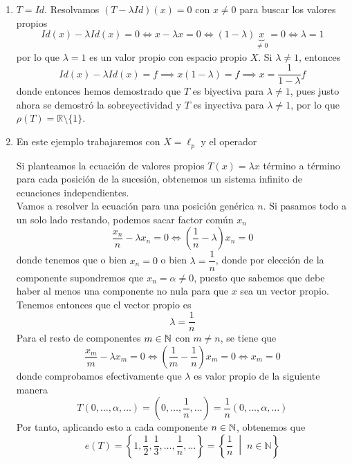 \begin{ejemplo}
    \begin{enumerate}
        \item $T = Id$. Resolvamos $(T - \lambda Id)(x) = 0$ con $x\neq 0$ para buscar los valores propios 
        \begin{equation*}
                Id(x) - \lambda Id(x) = 0\iff x - \lambda x = 0 \iff (1 - \lambda)\underbrace{x}_{\neq 0} = 0 \iff \lambda = 1
        \end{equation*}
        por lo que $\lambda = 1$ es un valor propio con espacio propio $X$. Si $\lambda \neq 1$, entonces 
        $$Id(x) - \lambda Id(x) = f \implies x(1 - \lambda) = f \implies x = \frac{1}{1 - \lambda} f$$ 
        donde entonces hemos demostrado que $T$ es biyectiva para $\lambda \neq 1$, pues justo ahora se demostró la sobreyectividad y $T$ es inyectiva para $\lambda \neq 1$, por lo que $\rho(T) = \mathbb{R} \setminus \{1\}$.
        \item En este ejemplo trabajaremos con $X = \ell_p$ y el operador

        Si planteamos la ecuación de valores propios $T(x) = \lambda x$ término a término para cada posición de la sucesión, obtenemos un sistema infinito de ecuaciones independientes. \\
        \noindent
        Vamos a resolver la ecuación para una posición genérica $n$. Si pasamos todo a un solo lado restando, podemos sacar factor común $x_n$
        $$\frac{x_n}{n} - \lambda x_n = 0 \iff \left(\frac{1}{n} - \lambda\right) x_n = 0$$
        donde tenemos que o bien $x_n = 0$ o bien $\lambda = \dfrac{1}{n}$, donde por elección de la componente supondremos que $x_n=\alpha\neq 0$, puesto que sabemos que debe haber al menos una componente no nula para que $x$ sea un vector propio. Tenemos entonces que el vector propio es 
        \begin{equation*}
            \lambda=\dfrac{1}{n}
        \end{equation*}
        Para el resto de componentes $m\in \mathbb{N}$ con $m\neq n$, se tiene que
        \begin{equation*}
            \frac{x_m}{m} - \lambda x_m = 0 \iff \left(\frac{1}{m} - \frac{1}{n}\right) x_m = 0 \iff x_m = 0
        \end{equation*}
        donde comprobamos efectivamente que $\lambda$ es valor propio de la siguiente manera 
        $$T(0, \dots, \alpha, \dots) = \left(0, \dots, \frac{1}{n}, \dots\right) = \frac{1}{n}(0, \dots, \alpha, \dots)$$
        Por tanto, aplicando esto a cada componente $n\in \mathbb{N}$, obtenemos que 
        $$e(T) = \left\{ 1, \frac{1}{2}, \frac{1}{3}, \dots, \frac{1}{n}, \dots \right\} = \left\{ \frac{1}{n} \;\middle|\; n \in \mathbb{N} \right\}$$
    \end{enumerate}
\end{ejemplo}

